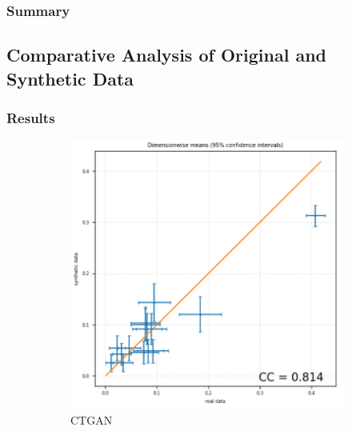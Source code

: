 \subsubsection{Summary}



\subsection{Comparative Analysis of Original and Synthetic Data}

\subsubsection{Results}


\begin{figure}[H]
    \centering
    \begin{subfigure}[b]{0.45\textwidth}
        \centering
        \includegraphics[width=\textwidth]{images/avg_dim_ctgan.png}
        \caption{CTGAN}
        \label{fig:avg_dim_ctgan}
    \end{subfigure}
    \hfill
    \begin{subfigure}[b]{0.45\textwidth}
        \centering

\end{subfigure}
\end{figure}
